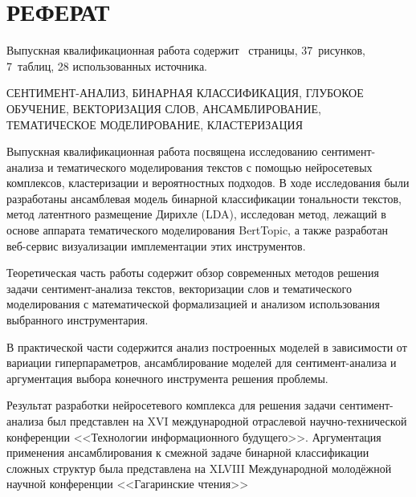 \chapter*{РЕФЕРАТ}

\bigskip\par
Выпускная квалификационная работа содержит \pageref*{LastPage}~страницы, 37~рисунков,                                        7~таблиц, 28 использованных источника.

\bigskip\par
СЕНТИМЕНТ-АНАЛИЗ, БИНАРНАЯ КЛАССИФИКАЦИЯ, ГЛУБОКОЕ ОБУЧЕНИЕ, ВЕКТОРИЗАЦИЯ СЛОВ, АНСАМБЛИРОВАНИЕ, ТЕМАТИЧЕСКОЕ МОДЕЛИРОВАНИЕ, КЛАСТЕРИЗАЦИЯ

\bigskip\par
Выпускная квалификационная работа посвящена исследованию сентимент-анализа и тематического моделирования текстов с помощью нейросетевых комплексов, кластеризации и вероятностных подходов. В ходе исследования были разработаны ансамблевая модель бинарной классификации тональности текстов, метод латентного размещение Дирихле (LDA), исследован метод, лежащий в основе аппарата тематического моделирования BertTopic, а также разработан веб-сервис визуализации имплементации этих инструментов.

\bigskip
Теоретическая часть работы содержит обзор современных методов решения задачи сентимент-анализа текстов, векторизации слов и тематического моделирования с математической формализацией и анализом использования выбранного инструментария.


\bigskip
В практической части содержится анализ построенных моделей в зависимости от вариации гиперпараметров, ансамблирование моделей для сентимент-анализа и аргументация выбора конечного инструмента решения проблемы.

\bigskip
Результат разработки нейросетевого комплекса для решения задачи сентимент-анализа был представлен на XVI международной отраслевой научно-технической конференции <<Технологии информационного будущего>>. Аргументация применения ансамблирования к смежной задаче бинарной классификации сложных структур была представлена на XLVIII Международной молодёжной научной конференции <<Гагаринские чтения>> \cite{gagar}
